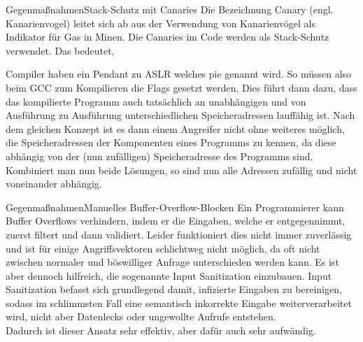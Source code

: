\begin{frame}{Gegenmaßnahmen}{Stack-Schutz mit Canaries} 
    Die Bezeichnung Canary (engl. Kanarienvogel) leitet sich ab aus der Verwendung von Kanarienvögel als
    Indikator für Gas in Minen. Die Canaries im Code werden als Stack-Schutz verwendet. Das bedeutet,
    
    Compiler haben ein Pendant zu ASLR welches pie
    genannt wird. So müssen also beim GCC zum Kompilieren die Flags 
    gesetzt werden. Dies führt dann dazu, dass das kompilierte Programm auch tatsächlich an
    unabhängigen und von Ausführung zu Ausführung unterschiedlichen Speicheradressen lauffähig
    ist.
    Nach dem gleichen Konzept ist es dann einem Angreifer nicht ohne weiteres möglich, die
    Speicheradressen der Komponenten eines Programms zu kennen, da diese abhängig
    von der (nun zufälligen) Speicheradresse des Programms sind. Kombiniert man nun beide Lösungen,
    so sind nun alle Adressen zufällig und nicht voneinander abhängig.
    
    
\end{frame}


\begin{frame}{Gegenmaßnahmen}{Manuelles Buffer-Overflow-Blocken}
    Ein Programmierer kann Buffer Overflows verhindern, indem er die Eingaben,
    welche er entgegennimmt, zuerst filtert und dann validiert. Leider funktioniert
    dies nicht immer zuverlässig und ist für einige Angriffsvektoren schlichtweg nicht
    möglich, da oft nicht zwischen normaler und böswilliger Anfrage unterschieden werden kann. 
    Es ist aber dennoch hilfreich, die sogenannte Input Sanitization einzubauen.
    Input Sanitization befasst sich grundlegend damit, infizierte Eingaben zu bereinigen, 
    sodass im schlimmsten Fall eine semantisch inkorrekte Eingabe weiterverarbeitet
    wird, nicht aber Datenlecks oder ungewollte Aufrufe entstehen. \\
    Dadurch ist dieser Ansatz sehr effektiv, aber dafür auch sehr aufwändig.
    
    
\end{frame}

